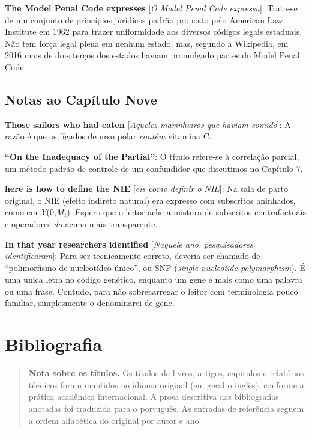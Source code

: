 \documentclass[11pt,a5paper,twoside]{book}
\begin{document}
\textbf{The Model Penal Code expresses} [\textit{O Model Penal Code expressa}]: Trata-se de um conjunto de princípios jurídicos padrão proposto pelo American Law Institute em 1962 para trazer uniformidade aos diversos códigos legais estaduais. Não tem força legal plena em nenhum estado, mas, segundo a Wikipedia, em 2016 mais de dois terços dos estados haviam promulgado partes do Model Penal Code.

\section{Notas ao Capítulo Nove}
\textbf{Those sailors who had eaten} [\textit{Aqueles marinheiros que haviam comido}]: A razão é que os fígados de urso polar \textit{contêm} vitamina C.

\textbf{“On the Inadequacy of the Partial”}: O título refere-se à correlação parcial, um método padrão de controle de um confundidor que discutimos no Capítulo 7.

\textbf{here is how to define the NIE} [\textit{eis como definir o NIE}]: Na sala de parto original, o NIE (efeito indireto natural) era expresso com subscritos aninhados, como em \textit{Y}(0,\textit{M}₁). Espero que o leitor ache a mistura de subscritos contrafactuais e operadores \textit{do} acima mais transparente.

\textbf{In that year researchers identified} [\textit{Naquele ano, pesquisadores identificaram}]: Para ser tecnicamente correto, deveria ser chamado de “polimorfismo de nucleotídeo único”, ou SNP (\textit{single nucleotide polymorphism}). É uma única letra no código genético, enquanto um gene é mais como uma palavra ou uma frase. Contudo, para não sobrecarregar o leitor com terminologia pouco familiar, simplesmente o denominarei de gene.

\chapter{Bibliografia}
\begin{quote}
\textbf{Nota sobre os títulos.} Os títulos de livros, artigos, capítulos e relatórios técnicos foram mantidos no idioma original (em geral o inglês), conforme a prática acadêmica internacional. A prosa descritiva das bibliografias anotadas foi traduzida para o português. As entradas de referência seguem a ordem alfabética do original por autor e ano.
\end{quote}
\vspace{1em}\hrule\vspace{1em}
\end{document}
